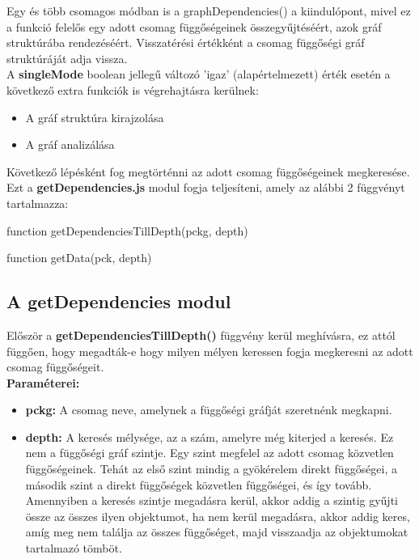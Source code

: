 Egy és több csomagos módban is a graphDependencies() a kiindulópont, mivel ez a funkció felelős egy adott csomag függőségeinek összegyűjtéséért, azok gráf struktúrába rendezéséért.
Visszatérési értékként a csomag függőségi gráf struktúráját adja vissza.\\

A \textbf{singleMode} boolean jellegű változó 'igaz' (alapértelmezett) érték esetén a következő extra funkciók is végrehajtásra kerülnek:
	\begin{itemize}
		\item A gráf struktúra kirajzolása
		\item A gráf analizálása
	\end{itemize}

Következő lépésként fog megtörténni az adott csomag függőségeinek megkeresése. Ezt a \textbf{getDependencies.js} modul fogja teljesíteni, amely az alábbi 2 függvényt tartalmazza:

\begin{js}
function getDependenciesTillDepth(pckg, depth)

function getData(pck, depth)
\end{js}

\subsection{A getDependencies modul}

Először a \textbf{getDependenciesTillDepth()} függvény kerül meghívásra, ez attól függően, hogy megadták-e hogy milyen mélyen keressen fogja megkeresni az adott csomag függőségeit.\\

\noindent \textbf{Paraméterei:}

\begin{itemize}
	\item \textbf{pckg: }A csomag neve, amelynek a függőségi gráfját szeretnénk megkapni.
	\item \textbf{depth: }A keresés mélysége, az a szám, amelyre még kiterjed a keresés. Ez nem a függőségi gráf szintje. Egy szint megfelel az adott csomag közvetlen függőségeinek. Tehát az első szint mindig a gyökérelem direkt függőségei, a második szint a direkt függőségek közvetlen függőségei, és így tovább.	Amennyiben a keresés szintje megadásra kerül, akkor addig a szintig gyűjti össze az összes ilyen objektumot, ha nem kerül megadásra, akkor addig keres, amíg meg nem találja az összes függőséget, majd visszaadja az objektumokat tartalmazó tömböt.
\end{itemize}

